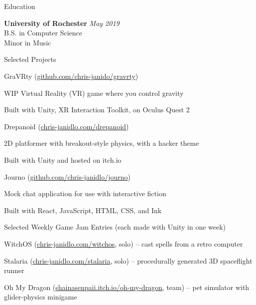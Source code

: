 \documentclass{resume} %
\begin{document}

\begin{rSection}{Education}

\textbf{University of Rochester} \hfill \textit{May 2019} \\ 
B.S. in Computer Science \\
Minor in Music

\end{rSection}


\begin{rSection}{Selected Projects}

\begin{rProject}{GraVRty (\href{https://github.com/chris-janidlo/gravrty}{github.com/chris-janido/gravrty})}
\item WIP Virtual Reality (VR) game where you control gravity
\item Built with Unity, XR Interaction Toolkit, on Oculus Quest 2
\end{rProject}

\begin{rProject}{Drepanoid (\href{http://chris-janidlo.com/drepanoid}{chris-janidlo.com/drepanoid})}
\item 2D platformer with breakout-style physics, with a hacker theme
\item Built with Unity and hosted on itch.io
\end{rProject}

\begin{rProject}{Journo (\href{https://github.com/chris-janidlo/journo}{github.com/chris-janidlo/journo})}
\item Mock chat application for use with interactive fiction
\item Built with React, JavaScript, HTML, CSS, and Ink
\end{rProject}

\begin{rProject}{Selected Weekly Game Jam Entries (each made with Unity in one week)}
\item WitchOS (\href{http://chris-janidlo.com/witchos}{\small chris-janidlo.com/witchos}, solo) – cast spells from a retro computer
\item Stalaria (\href{http://chris-janidlo.com/stalaria}{\small chris-janidlo.com/stalaria}, solo) – procedurally generated 3D spaceflight runner
\item Oh My Dragon (\href{http://shainasenpaii.itch.io/oh-my-dragon}{\small shainasenpaii.itch.io/oh-my-dragon}, team) – pet simulator with glider-physics minigame
\end{rProject}
\end{rSection}
\end{document}
